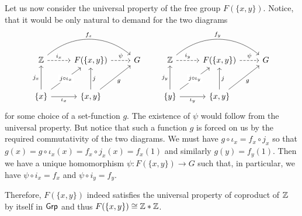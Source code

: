 \begin{solution}
	Let us now consider the universal property of the free group $F(\{x, y\})$. Notice, that it would be only natural to demand for the two diagrams
	\begin{equation*}
		\begin{tikzcd}[row sep=large]
			\Zs
			\arrow[r, dashrightarrow, "i_x"]
			\arrow[rr, bend left=40, "f_x"]
			& F(\{x, y\})
			\arrow[r, dashrightarrow, "\psi"]
			& G \\
			\{x\}
			\arrow[u, "j_x"]
			\arrow[r, "\iota_x"']
			\arrow[ur, "j \circ \iota_x" description]
			& \{x ,y\}
			\arrow[u, "j"']
			\arrow[ur, "g"']
			&
		\end{tikzcd}\qquad
		\begin{tikzcd}[row sep=large]
			\Zs
			\arrow[r, dashrightarrow, "i_y"]
			\arrow[rr, bend left=40, "f_y"]
			& F(\{x, y\})
			\arrow[r, dashrightarrow, "\psi"]
			& G \\
			\{y\}
			\arrow[u, "j_y"]
			\arrow[r, "\iota_y"']
			\arrow[ur, "j \circ \iota_y" description]
			& \{x ,y\}
			\arrow[u, "j"']
			\arrow[ur, "g"']
			&
		\end{tikzcd}
	\end{equation*}
	for some choice of a set-function $g$. The existence of $\psi$ would follow from the universal property. But notice that such a function $g$ is forced on us by the required commutativity of the two diagrams. We must have $g \circ \iota_x = f_x \circ j_x$ so that $g(x) = g \circ \iota_x(x) = f_x \circ j_x(x) = f_x(1)$ and similarly $g(y) = f_y(1)$. Then we have a unique homomorphism $\psi: F(\{x, y\}) \to G$ such that, in particular, we have $\psi \circ i_x = f_x$ and $\psi \circ i_y = f_y$.
	
	Therefore, $F(\{x, y\})$ indeed satisfies the universal property of coproduct of $\mathbb{Z}$ by itself in $\mathsf{Grp}$ and thus $F(\{x, y\}) \cong \mathbb{Z} * \mathbb{Z}$.
 \end{solution}

\begin{problem}
\end{problem}

